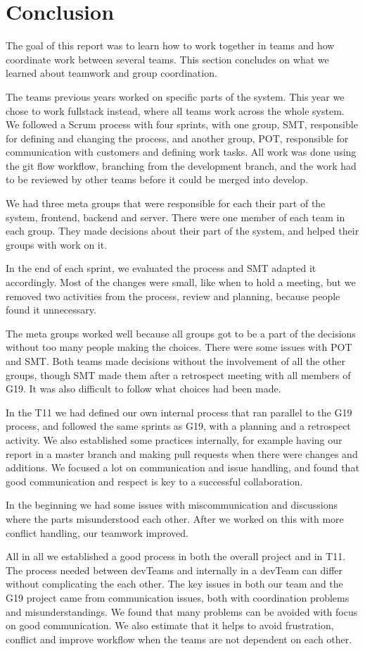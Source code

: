 \section{Conclusion}
The goal of this report was to learn how to work together in teams and how coordinate work between several teams. This section concludes on what we learned about teamwork and group coordination. 

The teams previous years worked on specific parts of the system. This year we chose to work fullstack instead, where all teams work across the whole system. We followed a Scrum process with four sprints, with one group, \gls{SMT}, responsible for defining and changing the process, and another group, \gls{POT},  responsible for communication with customers and defining work tasks. All work was done using the git flow workflow, branching from the development branch, and the work had to be reviewed by other teams before it could be merged into develop. 

We had three meta groups that were responsible for each their part of the system, frontend, backend and server. There were one member of each team in each group. They made decisions about their part of the system, and helped their groups with work on it. 

In the end of each sprint, we evaluated the process and \gls{SMT} adapted it accordingly. Most of the changes were small, like when to hold a meeting, but we removed two activities from the process, review and planning, because people found it unnecessary. 

The meta groups worked well because all groups got to be a part of the decisions without too many people making the choices. There were some issues with \gls{POT} and \gls{SMT}. Both teams made decisions without the involvement of all the other groups, though \gls{SMT} made them after a retrospect meeting with all members of \gls{G19}. It was also difficult to follow what choices had been made.

In the \gls{T11} we had defined our own internal process that ran parallel to the \gls{G19} process, and followed the same sprints as \gls{G19}, with a planning and a retrospect activity. We also established some practices internally, for example having our report in a master branch and making pull requests when there were changes and additions.  We focused a lot on communication and issue handling, and found that good communication and respect is key to a successful collaboration. 

In the beginning we had some issues with miscommunication and discussions where the parts misunderstood each other. After we worked on this with more conflict handling, our teamwork improved. 

All in all we established a good process in both the overall project and in \gls{T11}. The process needed between \glspl{devTeam} and internally in a \gls{devTeam} can differ without complicating the each other. The key issues in both our team and the \gls{G19} project came from communication issues, both with coordination problems and misunderstandings. We found that many problems can be avoided with focus on good communication. We also estimate that it helps to avoid frustration, conflict and improve workflow when the teams are not dependent on each other. 
